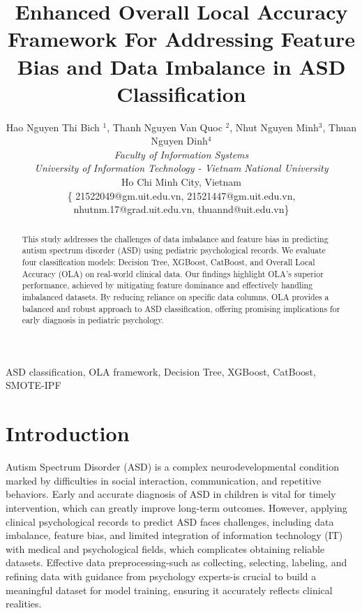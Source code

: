 \documentclass[conference]{IEEEtran}
\begin{document}
\title{Enhanced Overall Local Accuracy Framework For Addressing Feature Bias and Data Imbalance in ASD Classification}

\author{
Hao Nguyen Thi Bich $^{1}$, Thanh Nguyen Van Quoc $^{2}$, Nhut Nguyen Minh$^{3}$, Thuan Nguyen Dinh$^{4}$\\
\textit{Faculty of Information Systems} \\
\textit{University of Information Technology - Vietnam National University} \\
Ho Chi Minh City, Vietnam \\
\{ 21522049@gm.uit.edu.vn, 21521447@gm.uit.edu.vn, nhutnm.17@grad.uit.edu.vn, thuannd@uit.edu.vn\}
}


\maketitle
\IEEEpeerreviewmaketitle

\begin{abstract}
This study addresses the challenges of data imbalance and feature bias in predicting autism spectrum disorder (ASD) using pediatric psychological records. We evaluate four classification models: Decision Tree, XGBoost, CatBoost, and Overall Local Accuracy (OLA) on real-world clinical data. Our findings highlight OLA's superior performance, achieved by mitigating feature dominance and effectively handling imbalanced datasets. By reducing reliance on specific data columns, OLA provides a balanced and robust approach to ASD classification, offering promising implications for early diagnosis in pediatric psychology.
\end{abstract}

\begin{IEEEkeywords}
ASD classification, OLA framework, Decision Tree, XGBoost, CatBoost, SMOTE-IPF
\end{IEEEkeywords}
\section{Introduction}

Autism Spectrum Disorder (ASD) is a complex neurodevelopmental condition marked by difficulties in social interaction, communication, and repetitive behaviors. Early and accurate diagnosis of ASD in children is vital for timely intervention, which can greatly improve long-term outcomes. However, applying clinical psychological records to predict ASD faces challenges, including data imbalance, feature bias, and limited integration of information technology (IT) with medical and psychological fields, which complicates obtaining reliable datasets. Effective data preprocessing-such as collecting, selecting, labeling, and refining data with guidance from psychology experts-is crucial to build a meaningful dataset for model training, ensuring it accurately reflects clinical realities.
\end{document}
